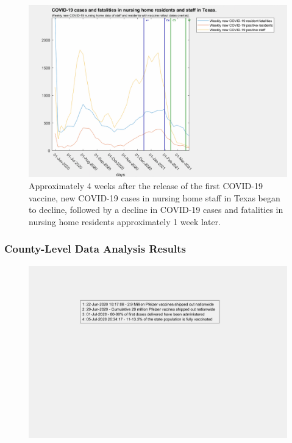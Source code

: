 \documentclass[twoside]{article}
\begin{document}
\begin{multicols}{2}
\begin{figure}[H]
	\includegraphics[width=\linewidth]{images/texas_nursing_home_with_vaccine.png}
	\caption{Approximately 4 weeks after the release of the first COVID-19 vaccine, new COVID-19 cases in nursing home staff in Texas began to decline, followed by a decline in COVID-19 cases and fatalities in nursing home residents approximately 1 week later. }
	\label{fig:images/texas_nursing_home_with_vaccineLabel}
\end{figure}

\subsubsection{County-Level Data Analysis Results}

\begin{figure}[H]
	\includegraphics[width=\linewidth]{legends/new_vaccine_rollout_legend.png}
	\caption{}
	\label{fig:legends/new_vaccine_rollout_legendLabel}
\end{figure}



\end{multicols}
\end{document}
